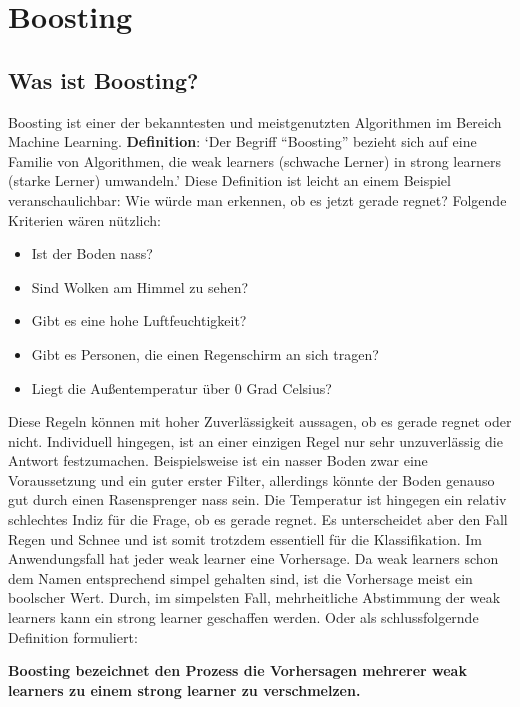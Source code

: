 \section{Boosting}

\subsection{Was ist Boosting?}
Boosting ist einer der bekanntesten und meistgenutzten Algorithmen im Bereich Machine Learning. 
\textbf{Definition}: `Der Begriff ``Boosting'' bezieht sich auf eine Familie von Algorithmen, die weak learners (schwache Lerner) in strong learners (starke Lerner) umwandeln.'\cite{quickIntroBoostingAlgo}
\newline
\newline
Diese Definition ist leicht an einem Beispiel veranschaulichbar:
Wie würde man erkennen, ob es jetzt gerade regnet? Folgende Kriterien wären nützlich:
\begin{itemize}
    \item Ist der Boden nass?
    \item Sind Wolken am Himmel zu sehen?
    \item Gibt es eine hohe Luftfeuchtigkeit?
    \item Gibt es Personen, die einen Regenschirm an sich tragen?
    \item Liegt die Außentemperatur über 0 Grad Celsius?
\end{itemize}
Diese Regeln können mit hoher Zuverlässigkeit aussagen, ob es gerade regnet oder nicht. Individuell hingegen, ist an einer einzigen Regel nur sehr unzuverlässig die Antwort festzumachen.
\newline
\newline
Beispielsweise ist ein nasser Boden zwar eine Voraussetzung und ein guter erster Filter, allerdings könnte der Boden genauso gut durch einen Rasensprenger nass sein.
\newline
Die Temperatur ist hingegen ein relativ schlechtes Indiz für die Frage, ob es gerade regnet. Es unterscheidet aber den Fall Regen und Schnee und ist somit trotzdem essentiell für die Klassifikation.
\newline
\newline
Im Anwendungsfall hat jeder weak learner eine Vorhersage. Da weak learners schon dem Namen entsprechend simpel gehalten sind, ist die Vorhersage meist ein boolscher Wert. Durch, im simpelsten Fall, mehrheitliche Abstimmung der weak learners kann ein strong learner geschaffen werden.\cite*{quickIntroBoostingAlgo} Oder als schlussfolgernde Definition formuliert:
\begin{mdframed}
    \textbf{Boosting bezeichnet den Prozess die Vorhersagen mehrerer weak learners zu einem strong learner zu verschmelzen. }
\end{mdframed}

